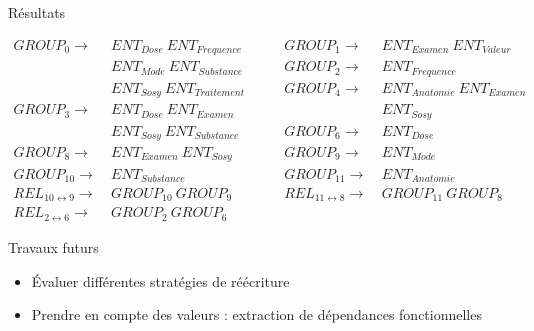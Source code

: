 \begin{frame}{Résultats}
    \begin{adjustbox}{max width=.9\textwidth}
        \centering
        \parbox{\linewidth}{\begin{align*}
            GROUP_0                     \to & ~ ENT_{Dose} ~ ENT_{Frequence}  & \qquad GROUP_1                    \to & ~ ENT_{Examen} ~ ENT_{Valeur}   \\
                                            & ~ ENT_{Mode} ~ ENT_{Substance}  & \qquad GROUP_2                    \to & ~ ENT_{Frequence}               \\
                                            & ~ ENT_{Sosy} ~ ENT_{Traitement} & \qquad GROUP_4                    \to & ~ ENT_{Anatomie} ~ ENT_{Examen} \\
            GROUP_3                     \to & ~ ENT_{Dose} ~ ENT_{Examen}     & \qquad                                & ~ ENT_{Sosy}                    \\
                                            & ~ ENT_{Sosy} ~ ENT_{Substance}  & \qquad GROUP_6                    \to & ~ ENT_{Dose}                    \\
            GROUP_8                     \to & ~ ENT_{Examen} ~ ENT_{Sosy}     & \qquad GROUP_9                    \to & ~ ENT_{Mode}                    \\
            GROUP_{10}                  \to & ~ ENT_{Substance}               & \qquad GROUP_{11}                 \to & ~ ENT_{Anatomie}                \\
            REL_{10 \leftrightarrow 9}  \to & ~ GROUP_{10} ~ GROUP_9          & \qquad REL_{11 \leftrightarrow 8} \to & ~ GROUP_{11} ~ GROUP_8          \\
            REL_{2 \leftrightarrow 6}   \to & ~ GROUP_2 ~ GROUP_6
        \end{align*}}
    \end{adjustbox}

    \begin{block}{Travaux futurs}
        \begin{itemize}
            \item Évaluer différentes stratégies de réécriture
            \item Prendre en compte des valeurs : extraction de dépendances fonctionnelles \cite{papenbrockFunctionalDependencyDiscovery2015}
        \end{itemize}
    \end{block}
\end{frame}
